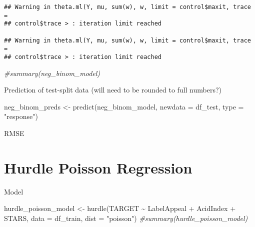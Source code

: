 \documentclass[
]{article}
\newenvironment{Shaded}{\begin{snugshade}}{\end{snugshade}}
\newcommand{\AttributeTok}[1]{\textcolor[rgb]{0.77,0.63,0.00}{#1}}
\newcommand{\CommentTok}[1]{\textcolor[rgb]{0.56,0.35,0.01}{\textit{#1}}}
\newcommand{\DecValTok}[1]{\textcolor[rgb]{0.00,0.00,0.81}{#1}}
\newcommand{\FunctionTok}[1]{\textcolor[rgb]{0.00,0.00,0.00}{#1}}
\newcommand{\NormalTok}[1]{#1}
\newcommand{\OtherTok}[1]{\textcolor[rgb]{0.56,0.35,0.01}{#1}}
\newcommand{\SpecialCharTok}[1]{\textcolor[rgb]{0.00,0.00,0.00}{#1}}
\newcommand{\StringTok}[1]{\textcolor[rgb]{0.31,0.60,0.02}{#1}}
\begin{document}
\begin{verbatim}
## Warning in theta.ml(Y, mu, sum(w), w, limit = control$maxit, trace =
## control$trace > : iteration limit reached

## Warning in theta.ml(Y, mu, sum(w), w, limit = control$maxit, trace =
## control$trace > : iteration limit reached
\end{verbatim}

\begin{Shaded}
\begin{Highlighting}[]
\CommentTok{\#summary(neg\_binom\_model)}
\end{Highlighting}
\end{Shaded}

Prediction of test-split data (will need to be rounded to full numbers?)

\begin{Shaded}
\begin{Highlighting}[]
\NormalTok{neg\_binom\_preds }\OtherTok{\textless{}{-}} \FunctionTok{predict}\NormalTok{(neg\_binom\_model, }\AttributeTok{newdata =}\NormalTok{ df\_test, }\AttributeTok{type =} \StringTok{"response"}\NormalTok{)}
\end{Highlighting}
\end{Shaded}

RMSE

\begin{Shaded}
\end{Shaded}

\hypertarget{hurdle-poisson-regression}{%
\section{Hurdle Poisson Regression}\label{hurdle-poisson-regression}}

Model

\begin{Shaded}
\begin{Highlighting}[]
\NormalTok{hurdle\_poisson\_model }\OtherTok{\textless{}{-}} \FunctionTok{hurdle}\NormalTok{(TARGET }\SpecialCharTok{\textasciitilde{}}\NormalTok{ LabelAppeal }\SpecialCharTok{+}\NormalTok{ AcidIndex }\SpecialCharTok{+}\NormalTok{ STARS, }\AttributeTok{data =}\NormalTok{ df\_train, }\AttributeTok{dist =} \StringTok{"poisson"}\NormalTok{)}
\CommentTok{\#summary(hurdle\_poisson\_model)}
\end{Highlighting}
\end{Shaded}
\end{document}
